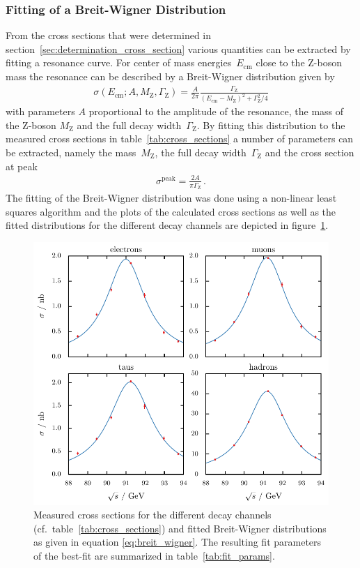 \documentclass[11pt, a4paper]{article}
\numberwithin{equation}{section}
\begin{document}
\subsubsection{Fitting of a Breit-Wigner Distribution}
\label{sec:fit_resonance}
From the cross sections that were determined in section~\ref{sec:determination_cross_section} various quantities can be extracted by fitting a resonance curve.
For center of mass energies~$E_\mathrm{cm}$ close to the Z-boson mass the resonance can be described by a Breit-Wigner distribution given by
\begin{align}
	\sigma(E_\mathrm{cm}; A, M_\mathrm{Z}, \Gamma_\mathrm{Z}) = \frac{A}{2\pi} \frac{\Gamma_\mathrm{Z}}{(E_\mathrm{cm} - M_\mathrm{Z})^2 + \Gamma_\mathrm{Z}^2 / 4}
	\label{eq:breit_wigner}
\end{align}
with parameters $A$ proportional to the amplitude of the resonance, the mass of the Z-boson $M_\mathrm{Z}$ and the full decay width~$\Gamma_\mathrm{Z}$.
By fitting this distribution to the measured cross sections in table~\ref{tab:cross_sections} a number of parameters can be extracted, namely the mass~$M_\mathrm{Z}$, the full decay width~$\Gamma_\mathrm{Z}$ and the cross section at peak
\begin{align}
	\sigma^\mathrm{peak} = \frac{2A}{\pi \Gamma_\mathrm{Z}} \,\text{.}
	\label{eq:peak_cross_section}
\end{align}
The fitting of the Breit-Wigner distribution was done using a non-linear least squares algorithm \cite{lmfit} and the plots of the calculated cross sections as well as the fitted distributions for the different decay channels are depicted in figure~\ref{fig:cross_section_fit}.
\begin{figure}[tb]
	\centering
	\includegraphics{./figures/cross_sections.pdf}
	\caption{Measured cross sections for the different decay channels (cf.\ table~\ref{tab:cross_sections}) and fitted Breit-Wigner distributions as given in equation \eqref{eq:breit_wigner}. The resulting fit parameters of the best-fit are summarized in table~\ref{tab:fit_params}.}
	\label{fig:cross_section_fit}
\end{figure}
\end{document}
